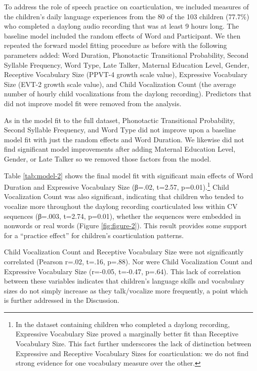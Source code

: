 \documentclass[a4paper,man,natbib,donotrepeattitle, apacite]{apa6}
\begin{document}
To address the role of speech practice on coarticulation, we included measures of the children’s daily language experiences from the 80 of the 103 children (77.7\%) who completed a daylong audio recording that was at least 9 hours long. The baseline model included the random effects of Word and Participant. We then repeated the forward model fitting procedure as before with the following parameters added: Word Duration, Phonotactic Transitional Probability, Second Syllable Frequency, Word Type, Late Talker, Maternal Education Level, Gender, Receptive Vocabulary Size (PPVT-4 growth scale value), Expressive Vocabulary Size (EVT-2 growth scale value), and Child Vocalization Count (the average number of hourly child vocalizations from the daylong recording). Predictors that did not improve model fit were removed from the analysis. 

As in the model fit to the full dataset, Phonotactic Transitional Probability, Second Syllable Frequency, and Word Type did not improve upon a baseline model fit with just the random effects and Word Duration. We likewise did not find significant model improvements after adding Maternal Education Level, Gender, or Late Talker so we removed those factors from the model. 

Table \ref{tab:model-2} shows the final model fit with significant main effects of Word Duration and Expressive Vocabulary Size (β=.02, t=2.57, p=0.01).\footnote{In the dataset containing children who completed a daylong recording, Expressive Vocabulary Size proved a marginally better fit than Receptive Vocabulary Size. This fact further underscores the lack of distinction between Expressive and Receptive Vocabulary Sizes for coarticulation: we do not find strong evidence for one vocabulary measure over the other.} Child Vocalization Count was also significant, indicating that children who tended to vocalize more throughout the daylong recording coarticulated less within CV sequences (β=.003, t=2.74, p=0.01), whether the sequences were embedded in nonwords or real words (Figure \ref{fig:figure-2}). This result provides some support for a ``practice effect'' for children’s coarticulation patterns.

Child Vocalization Count and Receptive Vocabulary Size were not significantly correlated (Pearson r=.02, t=.16, p=.88). Nor were Child Vocalization Count and Expressive Vocabulary Size (r=-0.05, t=-0.47, p=.64). This lack of correlation between these variables indicates that children’s language skills and vocabulary sizes do not simply increase as they talk/vocalize more frequently, a point which is further addressed in the Discussion.
\end{document}
